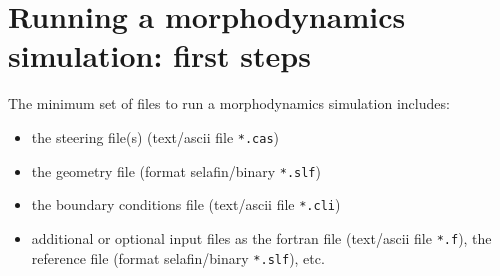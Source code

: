 \section{Running a morphodynamics simulation: first steps}
The minimum set of files to run a morphodynamics simulation includes:
\begin{itemize}
\item the steering file(s) (text/ascii file \texttt{*.cas})
\item the geometry file (format selafin/binary \texttt{*.slf})
\item the boundary conditions file (text/ascii file \texttt{*.cli})
\item additional or optional input files as the fortran file (text/ascii file \texttt{*.f}), the reference file (format selafin/binary \texttt{*.slf}), etc.
\end{itemize}

